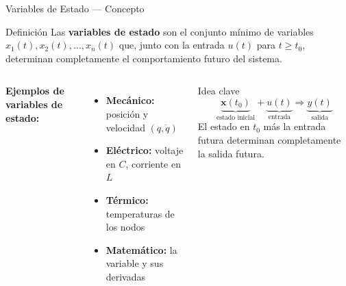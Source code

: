 \documentclass[aspectratio=169,xcolor=dvipsnames]{beamer}
\begin{document}
\begin{frame}{Variables de Estado --- Concepto}
    \begin{block}{Definici\'on}
        Las \textbf{variables de estado} son el conjunto m\'inimo de variables $x_1(t), x_2(t), \ldots, x_n(t)$ que, junto con la entrada $u(t)$ para $t \geq t_0$, determinan completamente el comportamiento futuro del sistema.
    \end{block}
 
    \begin{columns}
        \textbf{Ejemplos de variables de estado:}
        \begin{itemize}
            \item \textbf{Mec\'anico:} posici\'on y velocidad $(q, \dot{q})$
            \item \textbf{El\'ectrico:} voltaje en $C$, corriente en $L$
            \item \textbf{T\'ermico:} temperaturas de los nodos
            \item \textbf{Matem\'atico:} la variable y sus derivadas
        \end{itemize}
        \begin{exampleblock}{Idea clave}
            \[
                \underbrace{\mathbf{x}(t_0)}_{\text{estado inicial}} + \underbrace{u(t)}_{\text{entrada}} \Rightarrow \underbrace{y(t)}_{\text{salida}}
            \]
            El estado en $t_0$ m\'as la entrada futura determinan completamente la salida futura.
        \end{exampleblock}
    \end{columns}
\end{frame}
\end{document}
